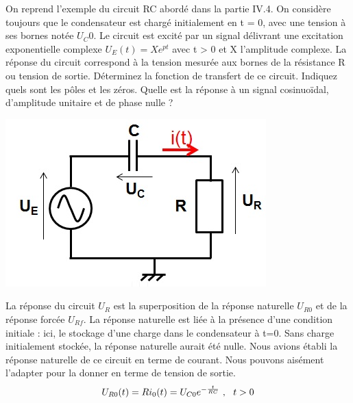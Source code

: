 \begin{remark}{}
	\begin{minipage}[l]{0.7\linewidth}
          On reprend l'exemple du circuit RC abordé dans la partie
          IV.4. On considère toujours que le condensateur est chargé
          initialement en t = 0, avec une tension à ses bornes notée
          $U_C0$. Le circuit est excité par un signal délivrant une
          excitation exponentielle complexe $U_{E}(t)=Xe^{pt}$ avec t
          > 0 et X l'amplitude complexe. La réponse du circuit
          correspond à la tension mesurée aux bornes de la résistance
          R ou tension de sortie. Déterminez la fonction de transfert
          de ce circuit. Indiquez quels sont les pôles et les
          zéros. Quelle est la réponse à un signal cosinuoïdal,
          d'amplitude unitaire et de phase nulle ?
	\end{minipage} \hfill
	\begin{minipage}[r]{0.4\linewidth}
          \includegraphics[scale=0.5]{images/circuit_RC_reponse_forcee.jpg}
	\end{minipage}
	\vspace{0.5\baselineskip}

	La réponse du circuit $U_{R}$ est la superposition de la
        réponse naturelle $U_{R0}$ et de la réponse forcée
        $U_{Rf}$. La réponse naturelle est liée à la présence d'une
        condition initiale : ici, le stockage d'une charge dans le
        condensateur à t=0. Sans charge initialement stockée, la
        réponse naturelle aurait été nulle. Nous avions établi la
        réponse naturelle de ce circuit en terme de courant. Nous
        pouvons aisément l'adapter pour la donner en terme de tension
        de sortie.
	\begin{equation*}\label{}
          U_{R0}(t)=Ri_{0}(t)=U_{C0}e^{-\frac{t}{RC}}~,~~t>0
	\end{equation*}


\end{remark}
